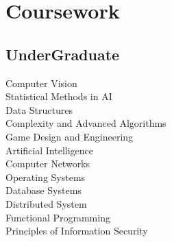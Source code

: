 \documentclass[]{deedy-resume-openfont}
\begin{document}
\begin{minipage}[t]{0.33\textwidth}
\section{Coursework}
\subsection{UnderGraduate}
Computer Vision \\
Statistical Methods in AI \\
Data Structures \\
Complexity and Advanced Algorithms \\
Game Design and Engineering \\
Artificial Intelligence \\
Computer Networks \\
Operating Systems \\
Database Systems \\
Distributed System \\
Functional Programming \\
Principles of Information Security\\
\sectionsep


%
%

\end{minipage} 
\hfill
\end{document}
